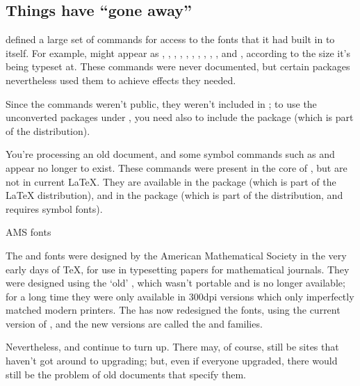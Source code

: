 \subsection{Things have ``gone away''}


\LaTeXo{} defined a large set of commands for access to the fonts
that it had built in to itself.  For example,  might
appear as , , ,
, , , , ,
, ,  and , according
to the size it's being typeset at.
These commands were never documented, but certain packages
nevertheless used them to achieve effects they needed.

Since the commands weren't public, they weren't included in \LaTeXe{};
to use the unconverted \LaTeXo{} packages under \LaTeXe{}, you need
also to include the  package (which is part of the
\LaTeXe{} distribution).


You're processing an old document, and some symbol commands such as
 and  appear no longer to exist.  These commands were
present in the core of \LaTeXo{}, but are not in current \LaTeX{}.
They are available in the  package (which is part of
the \LaTeX{} distribution), and in the  package
(which is part of the  distribution, and requires 
symbol fonts).
\begin{ctanrefs}
\item[AMS fonts]
\end{ctanrefs}


The  and  fonts were designed by the
American Mathematical Society in the very early days of \TeX{}, for
use in typesetting papers for mathematical journals.  They were
designed using the `old' \MF{}, which wasn't portable and is no longer
available; for a long time they were only available in 300dpi versions
which only imperfectly matched modern printers.  The  has
now redesigned the fonts, using the current version of \MF{}, and the
new versions are called the  and 
families.

Nevertheless,  and  continue to turn up.
There may, of course, still be sites that haven't got around to
upgrading; but, even if everyone upgraded, there would still be the
problem of old documents that specify them.

